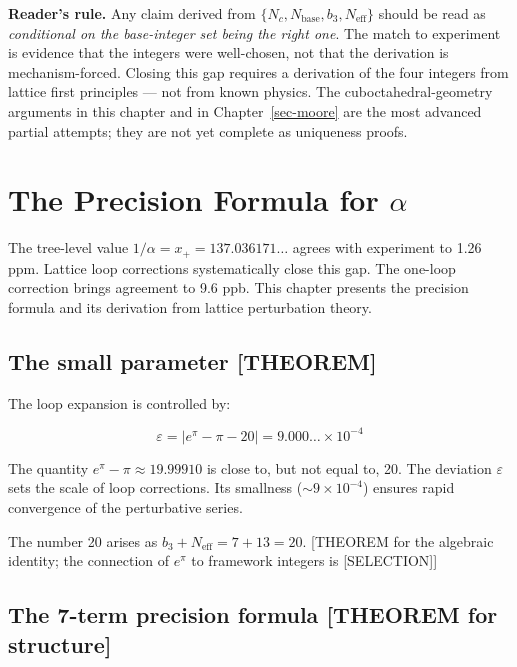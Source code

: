 \documentclass[
  11pt,
  letterpaper,
  twoside,
  openany]{book}
\makeatletter
\let\orig@section\section
\renewcommand{\section}{\needspace{8\baselineskip}\orig@section}
\makeatother
\begin{document}
\textbf{Reader's rule.} Any claim derived from
\(\{N_c, N_{\text{base}}, b_3, N_{\text{eff}}\}\) should be read as
\emph{conditional on the base-integer set being the right one}. The
match to experiment is evidence that the integers were well-chosen, not
that the derivation is mechanism-forced. Closing this gap requires a
derivation of the four integers from lattice first principles --- not
from known physics. The cuboctahedral-geometry arguments in this chapter
and in Chapter~\ref{sec-moore} are the most advanced partial attempts;
they are not yet complete as uniqueness proofs.

\chapter{\texorpdfstring{The Precision Formula for
\(\alpha\)}{The Precision Formula for \textbackslash alpha}}\label{sec-precision}

The tree-level value \(1/\alpha = x_+ = 137.036171\ldots\) agrees with
experiment to 1.26 ppm. Lattice loop corrections systematically close
this gap. The one-loop correction brings agreement to 9.6 ppb. This
chapter presents the precision formula and its derivation from lattice
perturbation theory.

\section{The small parameter
{[}THEOREM{]}}\label{the-small-parameter-theorem}

The loop expansion is controlled by:

\[
\varepsilon = |e^\pi - \pi - 20| = 9.000\ldots \times 10^{-4}
\tag{11.1}
\]

The quantity \(e^\pi - \pi \approx 19.99910\) is close to, but not equal
to, 20. The deviation \(\varepsilon\) sets the scale of loop
corrections. Its smallness (\(\sim 9 \times 10^{-4}\)) ensures rapid
convergence of the perturbative series.

The number 20 arises as \(b_3 + N_{\text{eff}} = 7 + 13 = 20\).
{[}THEOREM for the algebraic identity; the connection of \(e^\pi\) to
framework integers is {[}SELECTION{]}{]}

\section{The 7-term precision formula {[}THEOREM for
structure{]}}\label{the-7-term-precision-formula-theorem-for-structure}
\end{document}
